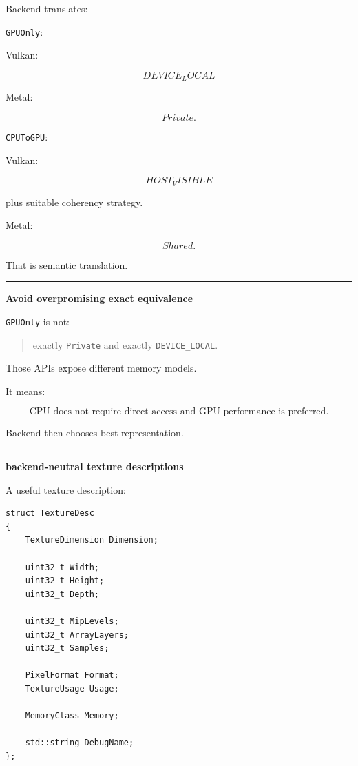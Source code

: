 Backend translates:

\texttt{GPUOnly}:

Vulkan:

\[
DEVICE_LOCAL
\]

Metal:

\[
Private.
\]

\texttt{CPUToGPU}:

Vulkan:

\[
HOST_VISIBLE
\]

plus suitable coherency strategy.

Metal:

\[
Shared.
\]

That is semantic translation.

\begin{center}\rule{0.5\linewidth}{0.5pt}\end{center}

\textbf{Avoid overpromising exact equivalence}

\texttt{GPUOnly} is not:

\begin{quote}
exactly \texttt{Private} and exactly \texttt{DEVICE\_LOCAL}.
\end{quote}

Those APIs expose different memory models.

It means:

\[
\boxed{
\text{CPU does not require direct access and GPU performance is preferred}.
}
\]

Backend then chooses best representation.

\begin{center}\rule{0.5\linewidth}{0.5pt}\end{center}

\textbf{backend-neutral texture descriptions}

A useful texture description:

\begin{verbatim}
struct TextureDesc
{
    TextureDimension Dimension;

    uint32_t Width;
    uint32_t Height;
    uint32_t Depth;

    uint32_t MipLevels;
    uint32_t ArrayLayers;
    uint32_t Samples;

    PixelFormat Format;
    TextureUsage Usage;

    MemoryClass Memory;

    std::string DebugName;
};
\end{verbatim}

